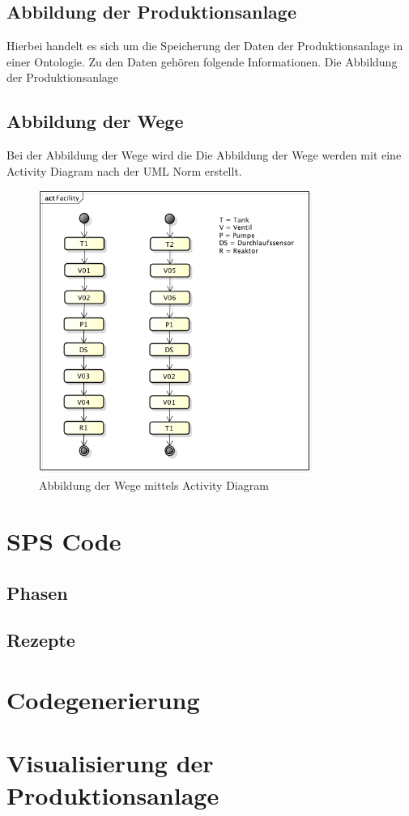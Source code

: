 \subsection{Abbildung der Produktionsanlage}
Hierbei handelt es sich um die Speicherung der Daten der Produktionsanlage in einer Ontologie. Zu den Daten gehören folgende Informationen. 
Die Abbildung der Produktionsanlage  

\subsection{Abbildung der Wege}
Bei der Abbildung der Wege wird die 
Die Abbildung der Wege werden mit eine Activity Diagram nach der UML Norm erstellt.
\begin{figure}[h!]
		\centering
		\includegraphics[width=0.8\textwidth]{graphics/konzept/UML_Activity.png}
		\caption{Abbildung der Wege mittels Activity Diagram}
\end{figure}

\section{SPS Code}
\subsection{Phasen}
\subsection{Rezepte}
\section{Codegenerierung}
\section{Visualisierung der Produktionsanlage}

